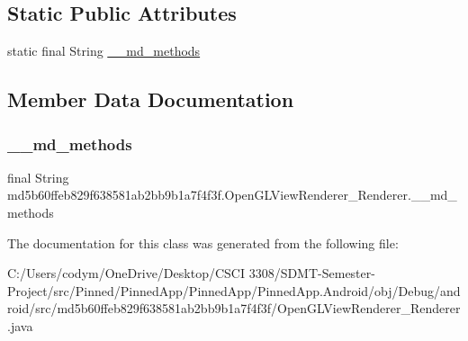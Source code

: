 \subsection*{Static Public Attributes}
\begin{DoxyCompactItemize}
\item 
static final String \hyperlink{classmd5b60ffeb829f638581ab2bb9b1a7f4f3f_1_1_open_g_l_view_renderer___renderer_a571e71003f6b143de8e407be41c7b3d3}{\+\_\+\+\_\+md\+\_\+methods}
\end{DoxyCompactItemize}


\subsection{Member Data Documentation}
\mbox{\label{classmd5b60ffeb829f638581ab2bb9b1a7f4f3f_1_1_open_g_l_view_renderer___renderer_a571e71003f6b143de8e407be41c7b3d3}} 
\subsubsection{\texorpdfstring{\+\_\+\+\_\+md\+\_\+methods}{\_\_md\_methods}}
{\footnotesize\ttfamily final String md5b60ffeb829f638581ab2bb9b1a7f4f3f.\+Open\+G\+L\+View\+Renderer\+\_\+\+Renderer.\+\_\+\+\_\+md\+\_\+methods\hspace{0.3cm}{\ttfamily [static]}}



The documentation for this class was generated from the following file\+:\begin{DoxyCompactItemize}
\item 
C\+:/\+Users/codym/\+One\+Drive/\+Desktop/\+C\+S\+C\+I 3308/\+S\+D\+M\+T-\/\+Semester-\/\+Project/src/\+Pinned/\+Pinned\+App/\+Pinned\+App/\+Pinned\+App.\+Android/obj/\+Debug/android/src/md5b60ffeb829f638581ab2bb9b1a7f4f3f/Open\+G\+L\+View\+Renderer\+\_\+\+Renderer.\+java\end{DoxyCompactItemize}
